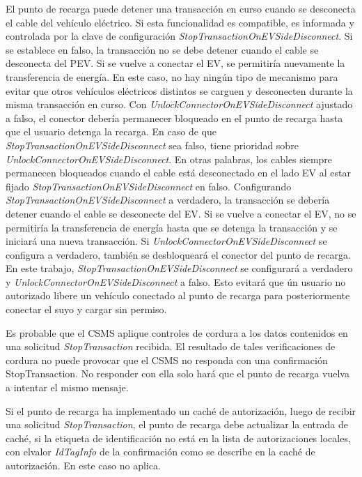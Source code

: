 \documentclass[12pt,a4paper,onecolumn,oneside]{report}
\begin{document}
El punto de recarga puede detener una transacción en curso cuando se desconecta el cable del vehículo eléctrico. Si esta funcionalidad es compatible, es informada y controlada por la clave de configuración \textit{StopTransactionOnEVSideDisconnect}. Si se establece en falso, la transacción no se debe detener cuando el cable se desconecta del PEV. Si se vuelve a conectar el EV, se permitiría nuevamente la transferencia de energía. En este caso, no hay ningún tipo de mecanismo para evitar que otros vehículos eléctricos distintos se carguen y desconecten durante la misma transacción en curso. Con \textit{UnlockConnectorOnEVSideDisconnect} ajustado a falso, el conector debería permanecer bloqueado en el punto de recarga hasta que el usuario detenga la recarga. En caso de que \textit{StopTransactionOnEVSideDisconnect} sea falso, tiene prioridad sobre \textit{UnlockConnectorOnEVSideDisconnect}. En otras palabras, los cables siempre permanecen bloqueados cuando el cable está desconectado en el lado EV al estar fijado \textit{StopTransactionOnEVSideDisconnect} en falso. Configurando \textit{StopTransactionOnEVSideDisconnect} a verdadero, la transacción se debería detener cuando el cable se desconecte del EV. Si se vuelve a conectar el EV, no se permitiría la transferencia de energía hasta que se detenga la transacción y se iniciará una nueva transacción. Si \textit{UnlockConnectorOnEVSideDisconnect} se configura a verdadero, también se desbloqueará el conector del punto de recarga. En este trabajo, \textit{StopTransactionOnEVSideDisconnect} se configurará a verdadero y  \textit{UnlockConnectorOnEVSideDisconnect} a falso. Esto evitará que ún usuario no autorizado libere un vehículo conectado al punto de recarga para posteriormente conectar el suyo y cargar sin permiso.

Es probable que el CSMS aplique controles de cordura a los datos contenidos en una solicitud \textit{StopTransaction} recibida. El resultado de tales verificaciones de cordura no puede provocar que el CSMS no responda con una confirmación StopTransaction. No responder con ella solo hará que el punto de recarga vuelva a intentar el mismo mensaje.

Si el punto de recarga ha implementado un caché de autorización, luego de recibir una solicitud \textit{StopTransaction}, el punto de recarga debe actualizar la entrada de caché, si la etiqueta de identificación no está en la lista de autorizaciones locales, con elvalor \textit{IdTagInfo} de la confirmación como se describe en la caché de autorización. En este caso no aplica.
\end{document}
